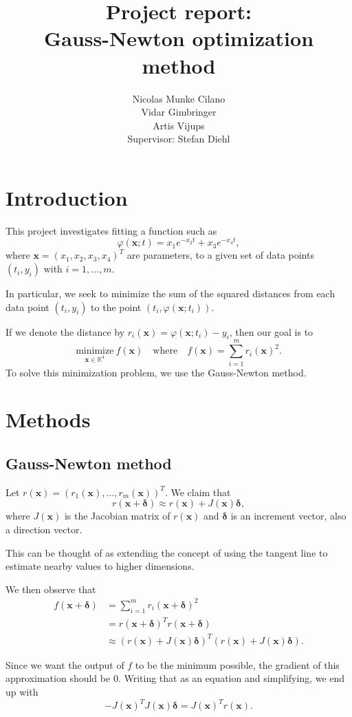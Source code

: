 \documentclass[12pt, a4paper]{article}
\title{Project report:
\\ Gauss-Newton optimization method}
\author{Nicolas Munke Cilano
\\ Vidar Gimbringer 
\\ Artis Vijups 
\vspace{20pt} \\ Supervisor: Stefan Diehl}
\newcommand{\bx}{\boldsymbol{x}}
\newcommand{\bd}{\boldsymbol{\delta}}
\begin{document}
\maketitle

\section{Introduction}

This project investigates fitting a function such as \[\varphi(\bx; t)=x_1e^{-x_2t}+x_3e^{-x_4t},\] where $\bx={(x_1,x_2,x_3,x_4)}^{T}$ are parameters, to a given set of data points $(t_i,y_i)$ with $i=1,\ldots,m.$

In particular, we seek to minimize the sum of the squared distances from each data point $(t_i,y_i)$ to the point $(t_i,\varphi(\bx; t_i))$.

If we denote the distance by $r_i(\bx)=\varphi(\bx; t_i)-y_i$, then our goal is to \[\underset{\bx\in\mathbb{R}^4}{\text{minimize}}~f(\bx)\quad\text{where}\quad f(\bx)=\sum_{i=1}^{m}{r_i(\bx)}^2.\] To solve this minimization problem, we use the Gauss-Newton method.

\section{Methods}

\subsection{Gauss-Newton method}

Let $r(\bx)={(r_1(\bx),\ldots,r_m(\bx))}^T$. We claim that \[r(\bx+\bd)\approx r(\bx)+J(\bx)\bd,\]where $J(\bx)$ is the Jacobian matrix of $r(\bx)$ and $\bd$ is an increment vector, also a direction vector.

This can be thought of as extending the concept of using the tangent line to estimate nearby values to higher dimensions.

We then observe that \begin{align*}
f(\bx+\bd) &= \sum_{i=1}^{m}{r_i(\bx+\bd)}^2 \\ 
&= {r(\bx+\bd)}^T r(\bx+\bd) \\
&\approx {(r(\bx)+J(\bx)\bd)}^T (r(\bx)+J(\bx)\bd).
\end{align*}

Since we want the output of $f $ to be the minimum possible, the gradient of this approximation should be $0$. Writing that as an equation and simplifying, we end up with \[-{J(\bx)}^T J(\bx)\bd={J(\bx)}^T r(\bx).\]
\end{document}
